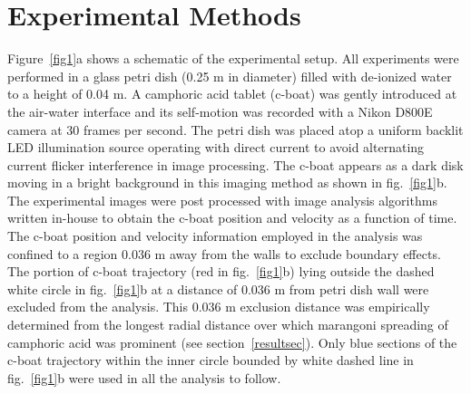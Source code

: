 \documentclass[journal=langd5, manuscript=article, layout=twocolumn]{achemso}
\begin{document}
\section{Experimental Methods}
\label{expsec}
Figure~\ref{fig1}a shows a schematic of the experimental setup. All experiments were performed in a glass petri dish (0.25 m in diameter) filled with de-ionized water to a height of 0.04 m. A camphoric acid tablet (c-boat) was gently introduced at the air-water interface and its self-motion was recorded with a Nikon D800E camera at 30 frames per second. The petri dish was placed atop a uniform backlit LED illumination source operating with direct current to avoid alternating current flicker interference in image processing.  The c-boat appears as a dark disk moving in a bright background in this imaging method as shown in fig.~\ref{fig1}b. The experimental images were post processed with image analysis algorithms written in-house to obtain the c-boat position and velocity as a function of time. The c-boat position and velocity information employed in the analysis was confined to a region 0.036 m away from the walls to exclude boundary effects. The portion of c-boat trajectory (red in fig.~\ref{fig1}b) lying outside the dashed white circle in fig.~\ref{fig1}b at a distance of 0.036 m from petri dish wall were excluded from the analysis. This 0.036 m exclusion distance was empirically determined from the longest radial distance over which marangoni spreading of camphoric acid was prominent (see section~\ref{resultsec}). Only blue sections of the c-boat trajectory within the inner circle bounded by white dashed line in fig.~\ref{fig1}b were used in all the analysis to follow.
\end{document}
